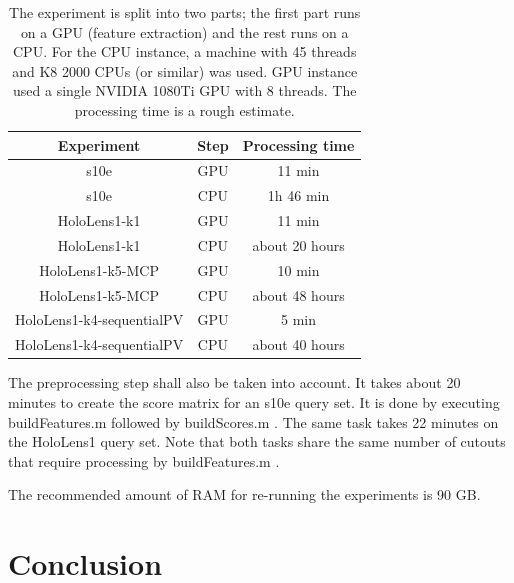 \documentclass[twoside]{ctuthesis}
\theoremstyle{plain}
\theoremstyle{definition}
\theoremstyle{note}
\newcommand{\code}[1]{{\ttfamily #1%
}}
\begin{document}
\begin{table}[htb!]
	\centering
	\begin{tabular}{|c|c|c|}
		\hline
		Experiment & Step & Processing time\\
		\hline
		\hline
		s10e & GPU & 11 min \\
		s10e & CPU & 1h 46 min \\
		\hline
		HoloLens1-k1 & GPU & 11 min \\
		HoloLens1-k1 & CPU & about 20 hours \\
		\hline
		HoloLens1-k5-MCP & GPU & 10 min \\
		HoloLens1-k5-MCP & CPU & about 48 hours \\
		\hline
		HoloLens1-k4-sequentialPV & GPU & 5 min \\
		HoloLens1-k4-sequentialPV & CPU & about 40 hours \\
		\hline
	\end{tabular}
	\caption[Processing times of the experiments]{The experiment is split into two parts; the first part runs on a GPU (feature extraction) and the rest runs on a CPU. For the CPU instance, a machine with 45 threads and K8 2000 CPUs (or similar) was used. GPU instance used a single NVIDIA 1080Ti GPU with 8 threads. The processing time is a rough estimate.}
	\label{tab:emperical-complexity}
\end{table}

The preprocessing step shall also be taken into account. It takes about 20 minutes to create the \code{score} matrix for an s10e query set. It is done by executing \code{buildFeatures.m} followed by \code{buildScores.m}. The same task takes 22 minutes on the HoloLens1 query set. Note that both tasks share the same number of cutouts that require processing by \code{buildFeatures.m}.

The recommended amount of RAM for re-running the experiments is 90 GB.

\chapter{Conclusion}
\label{chapter:conclusion}
\end{document}
